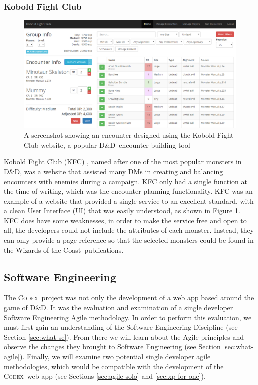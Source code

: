 \documentclass[final]{cmpreport}
\newcommand{\WotC}{Wizards of the Coast}
\newcommand{\dnd}{D\&D}
\newcommand{\Codex}{\textsc{Codex}}
\begin{document}
			\subsubsection{Kobold Fight Club} \label{sec:kfc}
			\begin{figure}
				\centering
				\includegraphics[width=0.8\linewidth]{kfc-screenshot.png}
				\caption[Kobold Fight Club Screenshot]{A screenshot showing an encounter designed using the Kobold Fight Club website, a popular \dnd \ encounter building tool}\label{fig:kfc}
			\end{figure}
			
			Kobold Fight Club (KFC) \citep{kfc-homepage}, named after one of the most popular monsters in \dnd, was a website that assisted many DMs in creating and balancing encounters with enemies during a campaign. KFC only had a single function at the time of writing, which was the encounter planning functionality. KFC was an example of a website that provided a single service to an excellent standard, with a clean User Interface (UI) that was easily understood, as shown in Figure \ref{fig:kfc}. KFC does have some weaknesses, in order to make the service free and open to all, the developers could not include the attributes of each monster. Instead, they can only provide a page reference so that the selected monsters could be found in the \WotC \ publications.
	
		\subsection{Software Engineering} \label{sec:software-eng}
		The \Codex \ project was not only the development of a web app based around the game of \dnd. It was the evaluation and examination of a single developer Software Engineering Agile methodology. In order to perform this evaluation, we must first gain an understanding of the Software Engineering Discipline (see Section \ref{sec:what-se}). From there we will learn about the Agile principles and observe the changes they brought to Software Engineering (see Section \ref{sec:what-agile}). Finally, we will examine two potential single developer agile methodologies, which would be compatible with the development of the \Codex \ web app (see Sections \ref{sec:agile-solo} and \ref{sec:xp-for-one}). 
			
\end{document}
